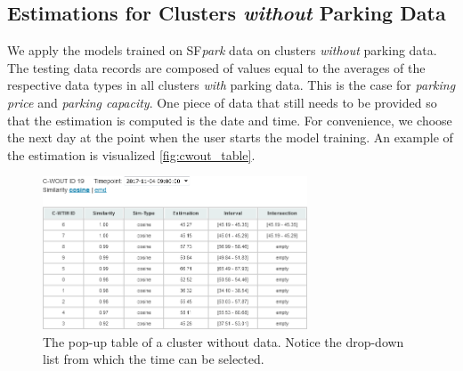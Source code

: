 \subsection{Estimations for Clusters \textit{without} Parking Data}
\label{evaluation:estimations_cwout}
We apply the models trained on SF\textit{park} data on clusters \textit{without} parking data.
The testing data records are composed of values equal to the averages of the respective data types in all clusters \textit{with} parking data.
This is the case for \textit{parking price} and \textit{parking capacity}.
One piece of data that still needs to be provided so that the estimation is computed is the date and time.
For convenience, we choose the next day at the point when the user starts the model training. 
An example of the estimation is visualized \autoref{fig:cwout_table}.

\begin{figure}[!ht]
	\centering
	\includegraphics[width=0.7\textwidth]{graphics/cwout_cosine_table.png}
	\caption{The pop-up table of a cluster without data.
Notice the drop-down list from which the time can be selected.}
	\label{fig:cwout_table}
\end{figure}

